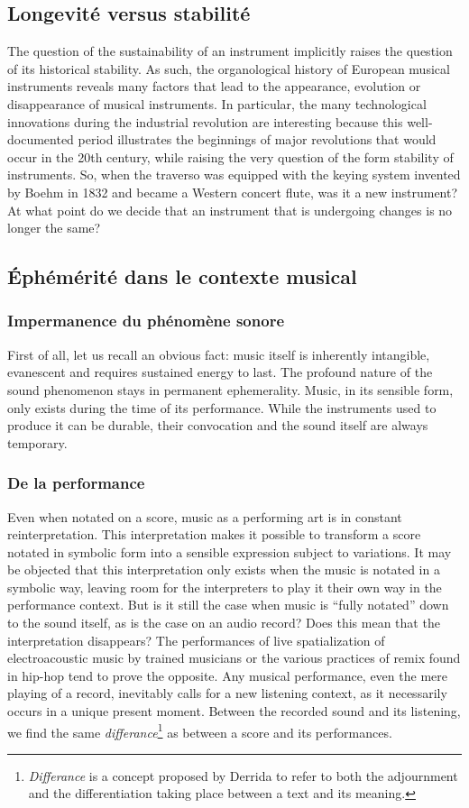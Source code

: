 \subsection{Longevité versus stabilité}
The question of the sustainability of an instrument implicitly raises the question of its historical stability. As such, the organological history of European musical instruments reveals many factors that lead to the appearance, evolution or disappearance of musical instruments. In particular, the many technological innovations during the industrial revolution are interesting because this well-documented period illustrates the beginnings of major revolutions that would occur in the 20th century, while raising the very question of the form stability of instruments. So, when the traverso was equipped with the keying system invented by Boehm in 1832 and became a Western concert flute, was it a new instrument? At what point do we decide that an instrument that is undergoing changes is no longer the same?

\subsection{Éphémérité dans le contexte musical}
\subsubsection{Impermanence du phénomène sonore}
\noindent First of all, let us recall an obvious fact: music itself is inherently intangible, evanescent and requires sustained energy to last. The profound nature of the sound phenomenon stays in permanent ephemerality. Music, in its sensible form, only exists during the time of its performance. While the instruments used to produce it can be durable, their convocation and the sound itself are always temporary. 

\subsubsection{De la performance}
\noindent Even when notated on a score, music as a performing art is in constant reinterpretation. This interpretation makes it possible to transform a score notated in symbolic form into a sensible expression subject to variations. It may be objected that this interpretation only exists when the music is notated in a symbolic way, leaving room for the interpreters to play it their own way in the performance context. But is it still the case when music is “fully notated” down to the sound itself, as is the case on an audio record? Does this mean that the interpretation disappears? The performances of live spatialization of electroacoustic music by trained musicians or the various practices of remix found in hip-hop tend to prove the opposite. Any musical performance, even the mere playing of a record, inevitably calls for a new listening context, as it necessarily occurs in a unique present moment. Between the recorded sound and its listening, we find the same \textit{differance}\footnote{\textit{Differance} is a concept proposed by Derrida \cite{derrida_lecriture_2014} to refer to both the adjournment and the differentiation taking place between a text and its meaning.} as between a score and its performances.

